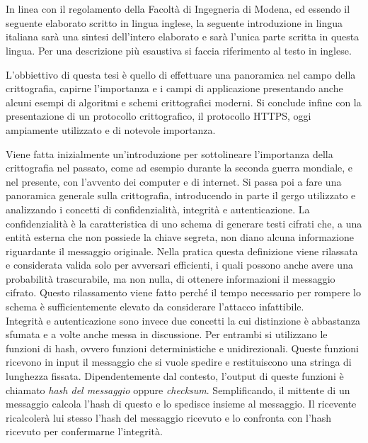 \chapter*{}
\par
In linea con il regolamento della Facoltà di Ingegneria di Modena, ed essendo il seguente elaborato scritto in lingua inglese, la seguente introduzione in lingua italiana sarà una sintesi dell'intero elaborato e sarà l'unica parte scritta in questa lingua. Per una descrizione più esaustiva si faccia riferimento al testo in inglese.
\par
L'obbiettivo di questa tesi è quello di effettuare una panoramica nel campo della crittografia, capirne l'importanza e i campi di applicazione presentando anche alcuni esempi di algoritmi e schemi crittografici moderni. Si conclude infine con la presentazione di un protocollo crittografico, il protocollo HTTPS, oggi ampiamente utilizzato e di notevole importanza.
\par
Viene fatta inizialmente un'introduzione per sottolineare l'importanza della crittografia nel passato, come ad esempio durante la seconda guerra mondiale, e nel presente, con l'avvento dei computer e di internet. Si passa poi a fare una panoramica generale sulla crittografia, introducendo in parte il gergo utilizzato e analizzando i concetti di confidenzialità, integrità e autenticazione. La confidenzialità è la caratteristica di uno schema di generare testi cifrati che, a una entità esterna che non possiede la chiave segreta, non diano alcuna informazione riguardante il messaggio originale. Nella pratica questa definizione viene rilassata e considerata valida solo per avversari efficienti, i quali possono anche avere una probabilità trascurabile, ma non nulla, di ottenere informazioni il messaggio cifrato. Questo rilassamento viene fatto perché il tempo necessario per rompere lo schema è sufficientemente elevato da considerare l'attacco infattibile.\\
 Integrità e autenticazione sono invece due concetti la cui distinzione è abbastanza sfumata e a volte anche messa in discussione. Per entrambi si utilizzano le funzioni di hash, ovvero funzioni deterministiche e unidirezionali. Queste funzioni ricevono in input il messaggio che si vuole spedire e restituiscono una stringa di lunghezza fissata. Dipendentemente dal contesto, l'output di queste funzioni è chiamato \emph{hash del messaggio} oppure \emph{checksum}. Semplificando, il mittente di un messaggio calcola l'hash di questo e lo spedisce insieme al messaggio. Il ricevente ricalcolerà lui stesso l'hash del messaggio ricevuto e lo confronta con l'hash ricevuto per confermarne l'integrità.
